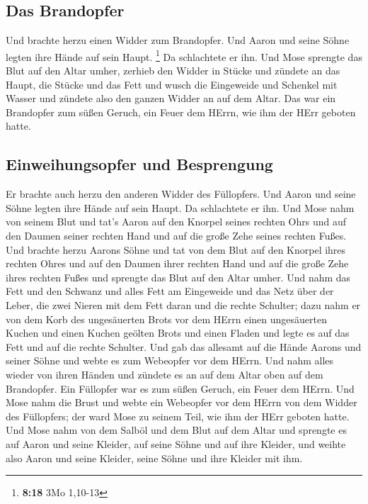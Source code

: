 \hypertarget{das-brandopfer}{%
\subsection{Das Brandopfer}\label{das-brandopfer}}

 Und brachte herzu einen Widder zum Brandopfer. Und Aaron
und seine Söhne legten ihre Hände auf sein Haupt. \footnote{\textbf{8:18}
  3Mo 1,10-13}  Da schlachtete er ihn. Und Mose sprengte
das Blut auf den Altar umher,  zerhieb den Widder in
Stücke und zündete an das Haupt, die Stücke und das Fett 
und wusch die Eingeweide und Schenkel mit Wasser und zündete also den
ganzen Widder an auf dem Altar. Das war ein Brandopfer zum süßen Geruch,
ein Feuer dem HErrn, wie ihm der HErr geboten hatte.

\hypertarget{einweihungsopfer-und-besprengung}{%
\subsection{Einweihungsopfer und
Besprengung}\label{einweihungsopfer-und-besprengung}}

 Er brachte auch herzu den anderen Widder des Füllopfers.
Und Aaron und seine Söhne legten ihre Hände auf sein Haupt.
 Da schlachtete er ihn. Und Mose nahm von seinem Blut und
tat's Aaron auf den Knorpel seines rechten Ohrs und auf den Daumen
seiner rechten Hand und auf die große Zehe seines rechten Fußes.
 Und brachte herzu Aarons Söhne und tat von dem Blut auf
den Knorpel ihres rechten Ohres und auf den Daumen ihrer rechten Hand
und auf die große Zehe ihres rechten Fußes und sprengte das Blut auf den
Altar umher.  Und nahm das Fett und den Schwanz und alles
Fett am Eingeweide und das Netz über der Leber, die zwei Nieren mit dem
Fett daran und die rechte Schulter;  dazu nahm er von dem
Korb des ungesäuerten Brots vor dem HErrn einen ungesäuerten Kuchen und
einen Kuchen geölten Brots und einen Fladen und legte es auf das Fett
und auf die rechte Schulter.  Und gab das allesamt auf
die Hände Aarons und seiner Söhne und webte es zum Webeopfer vor dem
HErrn.  Und nahm alles wieder von ihren Händen und
zündete es an auf dem Altar oben auf dem Brandopfer. Ein Füllopfer war
es zum süßen Geruch, ein Feuer dem HErrn.  Und Mose nahm
die Brust und webte ein Webeopfer vor dem HErrn von dem Widder des
Füllopfers; der ward Mose zu seinem Teil, wie ihm der HErr geboten
hatte.  Und Mose nahm von dem Salböl und dem Blut auf dem
Altar und sprengte es auf Aaron und seine Kleider, auf seine Söhne und
auf ihre Kleider, und weihte also Aaron und seine Kleider, seine Söhne
und ihre Kleider mit ihm.


